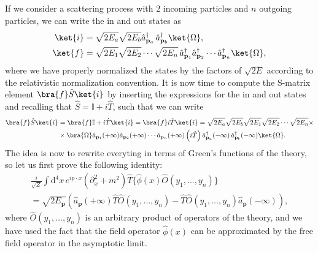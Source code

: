If we consider a scattering process with \(2\) incoming particles and \(n\) outgoing particles, we can write the in and out states as
\[
    \begin{aligned}
        \ket{i} & = \sqrt{2E_a} \sqrt{2E_b} \hat{a}^{\dagger}_{\mathbf{p}_a} \, \hat{a}^{\dagger}_{\mathbf{p}_b} \ket{\Omega},                                                            \\
        \ket{f} & = \sqrt{2E_1} \sqrt{2E_2} \cdots \sqrt{2E_n} \, \hat{a}^{\dagger}_{\mathbf{p}_1} \hat{a}^{\dagger}_{\mathbf{p}_2} \cdots \hat{a}^{\dagger}_{\mathbf{p}_n} \ket{\Omega},
    \end{aligned}
\]
where we have properly normalized the states by the factors of \(\sqrt{2E}\) according to the relativistic normalization convention. It is now time to compute the S-matrix element \(\bra{f} \hat{S} \ket{i}\) by inserting the expressions for the in and out states and recalling that \(\hat{S} = \mathbb{I} + i \hat{T}\), such that we can write
\[
    \begin{aligned}
        \bra{f} \hat{S} \ket{i} & = \bra{f} \mathbb{I} + i \hat{T} \ket{i} = \bra{f} i \hat{T} \ket{i} = \sqrt{2E_a} \sqrt{2E_b} \sqrt{2E_1} \sqrt{2E_2} \cdots \sqrt{2E_n} \times                                                                                                       \\
                                & \times \bra{\Omega} \hat{a}_{\mathbf{p}_1}(+\infty) \hat{a}_{\mathbf{p}_2}(+\infty) \cdots \hat{a}_{\mathbf{p}_n}(+\infty) \left(i \hat{T}\right) \hat{a}^{\dagger}_{\mathbf{p}_a}(-\infty) \, \hat{a}^{\dagger}_{\mathbf{p}_b}(-\infty) \ket{\Omega}.
    \end{aligned}
\]
The idea is now to rewrite everyting in terms of Green's functions of the theory, so let us first prove the following identity:
\[
    \begin{aligned}
        \frac{i}{\sqrt{Z}} \int \mathrm{d}^4 x \, e^{ip \cdot x} (\partial_x^2 + m^2) \hat{T} \{ \hat{\phi} (x) \hat{O} (y_1,\ldots,y_n)\} \\
        = \sqrt{2E_{\mathbf{p}}} \left( \hat{a}_{\mathbf{p}}(+\infty) \hat{T} \hat{O} (y_1,\ldots,y_n) - \hat{T} \hat{O} (y_1,\ldots,y_n) \hat{a}_{\mathbf{p}}(-\infty) \right),
    \end{aligned}
\]
where \(\hat{O} (y_1,\ldots,y_n)\) is an arbitrary product of operators of the theory, and we have used the fact that the field operator \(\hat{\phi}(x)\) can be approximated by the free field operator in the asymptotic limit.

